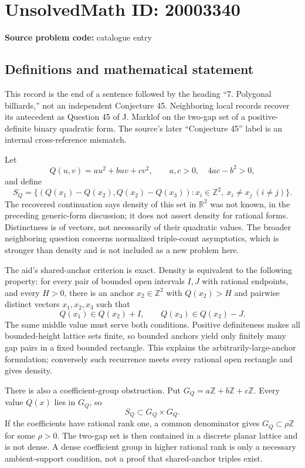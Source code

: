 \documentclass[11pt]{article}
\newcommand{\Z}{\mathbb{Z}}
\newcommand{\R}{\mathbb{R}}
\begin{document}
\section*{UnsolvedMath ID: 20003340}
\textbf{Source problem code:} catalogue entry
\subsection{Definitions and mathematical statement}
This record is the end of a sentence followed by the heading ``7. Polygonal billiards,'' not an independent Conjecture 45. Neighboring local records recover its antecedent as Question 45 of J. Marklof on the two-gap set of a positive-definite binary quadratic form. The source's later ``Conjecture 45'' label is an internal cross-reference mismatch.

Let
\[
 Q(u,v)=a u^2+buv+c v^2,\qquad a,c>0,\quad4ac-b^2>0,
\]
and define
\[
 S_Q=\{(Q(x_1)-Q(x_2),Q(x_2)-Q(x_3)):
        x_i\in\Z^2,\ x_i\ne x_j\ (i\ne j)\}.
\]
The recovered continuation says density of this set in $\R^2$ was not known, in the preceding generic-form discussion; it does not assert density for rational forms. Distinctness is of vectors, not necessarily of their quadratic values. The broader neighboring question concerns normalized triple-count asymptotics, which is stronger than density and is not included as a new problem here.

The aid's shared-anchor criterion is exact. Density is equivalent to the following property: for every pair of bounded open intervals $I,J$ with rational endpoints, and every $H>0$, there is an anchor $x_2\in\Z^2$ with $Q(x_2)>H$ and pairwise distinct vectors $x_1,x_2,x_3$ such that
\[
 Q(x_1)\in Q(x_2)+I,\qquad
 Q(x_3)\in Q(x_2)-J.
\]
The same middle value must serve both conditions. Positive definiteness makes all bounded-height lattice sets finite, so bounded anchors yield only finitely many gap pairs in a fixed bounded rectangle. This explains the arbitrarily-large-anchor formulation; conversely such recurrence meets every rational open rectangle and gives density.

There is also a coefficient-group obstruction. Put $G_Q=a\Z+b\Z+c\Z$. Every value $Q(x)$ lies in $G_Q$, so
\[
 S_Q\subset G_Q\times G_Q.
\]
If the coefficients have rational rank one, a common denominator gives $G_Q\subset\rho\Z$ for some $\rho>0$. The two-gap set is then contained in a discrete planar lattice and is not dense. A dense coefficient group in higher rational rank is only a necessary ambient-support condition, not a proof that shared-anchor triples exist.
\end{document}
